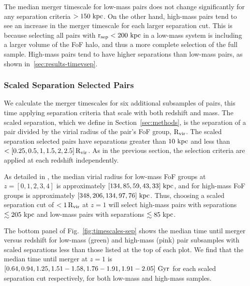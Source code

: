\documentclass[twocolumn,linenumbers]{aastex631}
\newcommand{\kc}[1]{\textcolor{yellow}{\textbf{kc: #1}} }
\newcommand{\chambe}{\citet{Chamberlain2024}}
\begin{document}
        The median merger timescale for low-mass pairs does not change significantly for any separation criteria $>150\,\mathrm{\,kpc}$. 
        On the other hand, high-mass pairs tend to see an increase in the merger timescale for each larger separation cut. 
        This is because selecting all pairs with $\rm r_{sep}<200\,\mathrm{\,kpc}$ in a low-mass system is including a larger volume of the FoF halo, and thus a more complete selection of the full sample.
        High-mass pairs tend to have higher separations than low-mass pairs, as shown in~\ref{sec:results-timevsep}. 

    \subsubsection{Scaled Separation Selected Pairs}
    \label{sec:results-scal}
        We calculate the merger timescales for six additional subsamples of pairs, this time applying separation criteria that scale with both redshift and mass.
        The scaled separation, which we define in Section~\ref{sec:methods}, is the separation of a pair divided by the virial radius of the pair's FoF group, $\rm R_{vir}$. 
        The scaled separation selected pairs have separations greater than $10\,\mathrm{\,kpc}$ and less than $<[0.25, 0.5, 1, 1.5, 2, 2.5]\,\rm R_{vir}$. 
        As in the previous section, the selection criteria are applied at each redshift independently. 
        
        As detailed in \chambe{}, the median virial radius for low-mass FoF groups at $z=[0,1,2,3,4]$ is approximately $[134, 85, 59, 43, 33]\,\mathrm{\,kpc}$, and for high-mass FoF groups is approximately $[348, 206, 134, 97, 76]\,\mathrm{\,kpc}$.
        Thus, choosing a scaled separation cut of $<1\,\rm R_{vir}$ at $z=1$ will select high-mass pairs with separations $\lesssim205\,\mathrm{\,kpc}$ and low-mass pairs with separations $\lesssim85\,\mathrm{\,kpc}$.
        
        The bottom panel of Fig.~\ref{fig:timescales-sep} shows the median time until merger versus redshift for low-mass (green) and high-mass (pink) pair subsamples with scaled separations less than those listed at the top of each plot. 
        We find that the median time until merger at $z=1$ is $[0.64, 0.94,1.25,1.51-1.58,1.76-1.91,1.91-2.05]\,\mathrm{\,Gyr}$ for each scaled separation cut respectively, for both low-mass and high-mass samples. %
        
\end{document}
